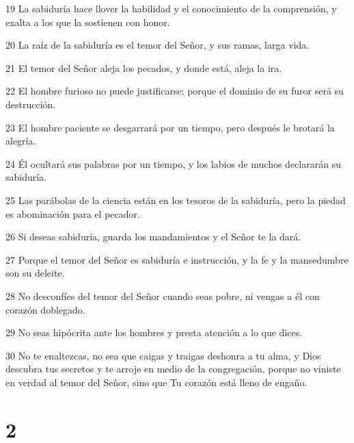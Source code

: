 \par 19 La sabiduría hace llover la habilidad y el conocimiento de la comprensión, y exalta a los que la sostienen con honor.
\par 20 La raíz de la sabiduría es el temor del Señor, y sus ramas, larga vida.
\par 21 El temor del Señor aleja los pecados, y donde está, aleja la ira.
\par 22 El hombre furioso no puede justificarse; porque el dominio de su furor será su destrucción.
\par 23 El hombre paciente se desgarrará por un tiempo, pero después le brotará la alegría.
\par 24 Él ocultará sus palabras por un tiempo, y los labios de muchos declararán su sabiduría.
\par 25 Las parábolas de la ciencia están en los tesoros de la sabiduría, pero la piedad es abominación para el pecador.
\par 26 Si deseas sabiduría, guarda los mandamientos y el Señor te la dará.
\par 27 Porque el temor del Señor es sabiduría e instrucción, y la fe y la mansedumbre son su deleite.
\par 28 No desconfíes del temor del Señor cuando seas pobre, ni vengas a él con corazón doblegado.
\par 29 No seas hipócrita ante los hombres y presta atención a lo que dices.
\par 30 No te enaltezcas, no sea que caigas y traigas deshonra a tu alma, y ​​Dios descubra tus secretos y te arroje en medio de la congregación, porque no viniste en verdad al temor del Señor, sino que Tu corazón está lleno de engaño.

\chapter{2}

